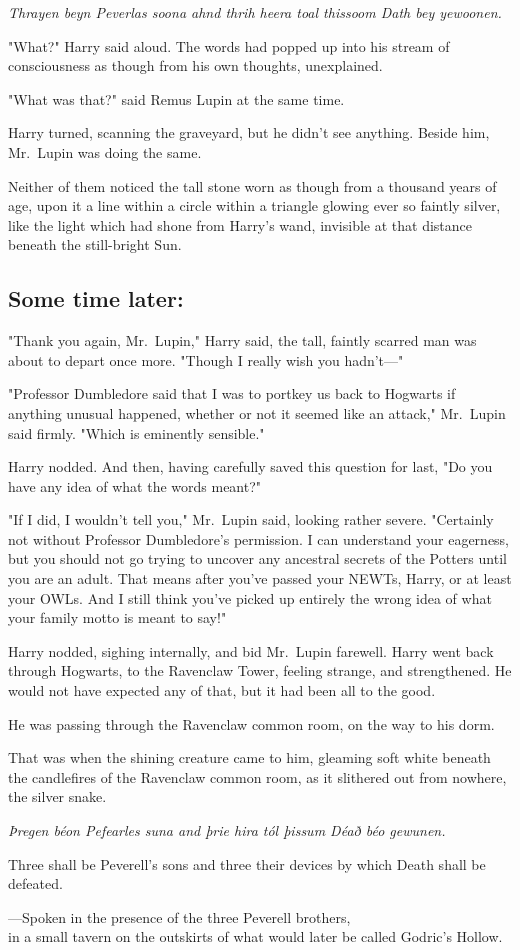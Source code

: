 \emph{Thrayen beyn Peverlas soona ahnd thrih heera toal thissoom Dath bey
yewoonen.}

"What?" Harry said aloud. The words had popped up into his stream of
consciousness as though from his own thoughts, unexplained.

"What was that?" said Remus Lupin at the same time.

Harry turned, scanning the graveyard, but he didn't see anything. Beside him,
Mr.~Lupin was doing the same.

Neither of them noticed the tall stone worn as though from a thousand years of
age, upon it a line within a circle within a triangle glowing ever so faintly
silver, like the light which had shone from Harry's wand, invisible at that
distance beneath the still-bright Sun.
\sbreak
\vspace{-2\baselineskip}
\subsection{Some time later:}

"Thank you again, Mr.~Lupin," Harry said, the tall, faintly scarred man was
about to depart once more. "Though I really wish you hadn't—"

"Professor Dumbledore said that I was to portkey us back to Hogwarts if
anything unusual happened, whether or not it seemed like an attack," Mr.~Lupin
said firmly. "Which is eminently sensible."

Harry nodded. And then, having carefully saved this question for last, "Do you
have any idea of what the words meant?"

"If I did, I wouldn't tell you," Mr.~Lupin said, looking rather severe.
"Certainly not without Professor Dumbledore's permission. I can understand your
eagerness, but you should not go trying to uncover any ancestral secrets of the
Potters until you are an adult. That means after you've passed your NEWTs,
Harry, or at least your OWLs. And I still think you've picked up entirely the
wrong idea of what your family motto is meant to say!"

Harry nodded, sighing internally, and bid Mr.~Lupin farewell.
\sbreak
Harry went back through Hogwarts, to the Ravenclaw Tower, feeling strange, and
strengthened. He would not have expected any of that, but it had been all to
the good.

He was passing through the Ravenclaw common room, on the way to his dorm.

That was when the shining creature came to him, gleaming soft white beneath the
candlefires of the Ravenclaw common room, as it slithered out from nowhere, the
silver snake.
\sbreak
\begin{center}
\emph{Þregen béon Pefearles suna and þrie hira
tól þissum Déað béo gewunen.}

Three shall be Peverell's sons and three their devices by which Death shall be
defeated.

—Spoken in the presence of the three Peverell brothers,\\
in a small tavern on the outskirts of what would later be called Godric's
Hollow.
\end{center}
